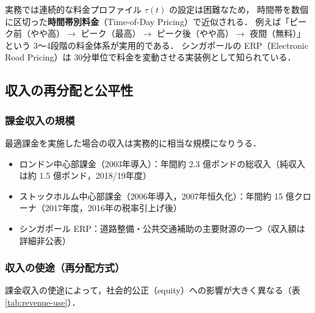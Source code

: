 実務では連続的な料金プロファイル $\tau(t)$ の設定は困難なため，
時間帯を数個に区切った\textbf{時間帯別料金}（Time-of-Day Pricing）で近似される．
例えば「ピーク前（やや高）$\rightarrow$ ピーク（最高）$\rightarrow$ ピーク後（やや高）$\rightarrow$ 夜間（無料）」という
3〜4段階の料金体系が実用的である．
シンガポールの ERP（Electronic Road Pricing）は
30分単位で料金を変動させる実装例として知られている．

\subsection{収入の再分配と公平性}
\label{subsec:redistribution}

\subsubsection*{課金収入の規模}

最適課金を実施した場合の収入は実務的に相当な規模になりうる．

\begin{itemize}
  \item ロンドン中心部課金（2003年導入）：年間約 2.3 億ポンドの総収入（純収入は約 1.5 億ポンド，2018/19年度）
  \item ストックホルム中心部課金（2006年導入，2007年恒久化）：年間約 15 億クローナ（2017年度，2016年の税率引上げ後）
  \item シンガポール ERP：道路整備・公共交通補助の主要財源の一つ（収入額は詳細非公表）
\end{itemize}

\subsubsection*{収入の使途（再分配方式）}

課金収入の使途によって，社会的公正（equity）への影響が大きく異なる（表\ref{tab:revenue-use}）．

